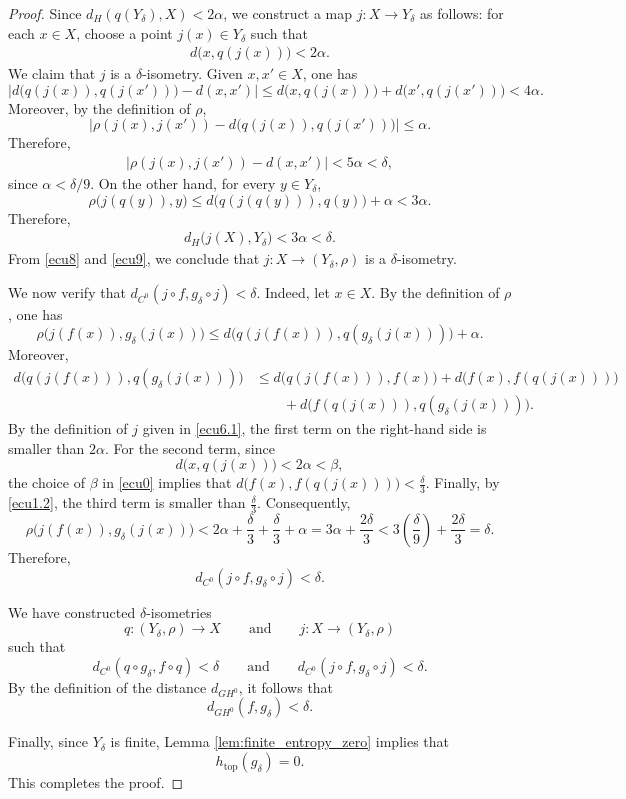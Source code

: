 \documentclass[10pt,a4paper]{amsart}
\DeclareMathOperator{\topo}{top}
\begin{document}
\begin{proof}
Since $d_H(q(Y_\delta),X)<2\alpha$, we construct a map $j:X\to Y_\delta$ as follows: for each $x\in X$, choose a point $j(x)\in Y_\delta$ such that
\begin{eqnarray}\label{ecu6.1}
d\bigl(x,q(j(x))\bigr)<2\alpha.
\end{eqnarray}
We claim that $j$ is a $\delta$-isometry. Given $x,x'\in X$, one has
\[
\bigl|d\bigl(q(j(x)),q(j(x'))\bigr)-d(x,x')\bigr|
\le
 d\bigl(x,q(j(x))\bigr)+d\bigl(x',q(j(x'))\bigr)
<
4\alpha.
\]
Moreover, by the definition of $\rho$,
\[
\bigl|\rho(j(x),j(x'))-d\bigl(q(j(x)),q(j(x'))\bigr)\bigr|
\le \alpha.
\]
Therefore,
\begin{eqnarray}\label{ecu8}
\bigl|\rho(j(x),j(x'))-d(x,x')\bigr|
<
5\alpha
<
\delta,
\end{eqnarray}
since $\alpha<\delta/9$. On the other hand, for every $y\in Y_\delta$,
\[
\rho\bigl(j(q(y)),y\bigr)
\le
 d\bigl(q(j(q(y))),q(y)\bigr)+\alpha
<
3\alpha.
\]
Therefore,
\begin{eqnarray}\label{ecu9}
d_H\bigl(j(X),Y_\delta\bigr)<3\alpha<\delta.
\end{eqnarray}
From \eqref{ecu8} and \eqref{ecu9}, we conclude that $j:X\to (Y_\delta,\rho)$
is a $\delta$-isometry.
\vspace{0.3cm}

We now verify that $d_{C^0}(j\circ f,g_\delta\circ j)<\delta$. Indeed, let $x\in X$. By the definition of $\rho$, one has
\[
\rho\bigl(j(f(x)),g_\delta(j(x))\bigr)
\le
 d\bigl(q(j(f(x))),q(g_\delta(j(x)))\bigr)+\alpha.
\]
Moreover,
\[
\begin{aligned}
d\bigl(q(j(f(x))),q(g_\delta(j(x)))\bigr)
&\le
 d\bigl(q(j(f(x))),f(x)\bigr)
+d\bigl(f(x),f(q(j(x)))\bigr)\\
&\qquad
+d\bigl(f(q(j(x))),q(g_\delta(j(x)))\bigr).
\end{aligned}
\]
By the definition of $j$ given in \eqref{ecu6.1}, the first term on the right-hand side is smaller than $2\alpha$. For the second term, since
\[
d\bigl(x,q(j(x))\bigr)<2\alpha<\beta,
\]
the choice of $\beta$ in \eqref{ecu0} implies that $d\bigl(f(x),f(q(j(x)))\bigr)<\frac{\delta}{3}$.
Finally, by \eqref{ecu1.2}, the third term is smaller than $\frac{\delta}{3}$. Consequently,
\[
\rho\bigl(j(f(x)),g_\delta(j(x))\bigr)
<
2\alpha+\frac{\delta}{3}+\frac{\delta}{3}+\alpha
=
3\alpha+\frac{2\delta}{3}
<
3\left(\frac{\delta}{9}\right)+\frac{2\delta}{3}
=
\delta.
\]
Therefore,
\[
d_{C^0}(j\circ f,g_\delta\circ j)<\delta.
\]

We have constructed $\delta$-isometries
\[
q:(Y_\delta,\rho)\to X
\qquad\text{and}\qquad
j:X\to (Y_\delta,\rho)
\]
such that
\[
d_{C^0}(q\circ g_\delta,f\circ q)<\delta
\qquad\text{and}\qquad
d_{C^0}(j\circ f,g_\delta\circ j)<\delta.
\]
By the definition of the distance $d_{GH^0}$, it follows that
\[
d_{GH^0}(f,g_\delta)<\delta.
\]

Finally, since $Y_\delta$ is finite, Lemma \ref{lem:finite_entropy_zero} implies that
\[
h_{\topo}(g_\delta)=0.
\]
This completes the proof.
\end{proof}
\end{document}
